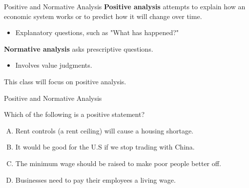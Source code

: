 \documentclass{beamer}
\begin{document}
\begin{frame}{Positive and Normative Analysis}
  \textbf{Positive analysis} attempts to explain how an economic system works or to predict how it will change over time.

  \begin{itemize}
    \item Explanatory questions, such as "What has happened?"
  \end{itemize}

  \bigskip
  \textbf{Normative analysis} asks prescriptive questions.

  \begin{itemize}
    \item Involves value judgments.
  \end{itemize}

  \bigskip
  \begin{center}
  This class will focus on positive analysis.
  \end{center}
\end{frame}

\begin{frame}{Positive and Normative Analysis}
  \bigskip

  Which of the following is a positive statement?

  \bigskip
  \begin{enumerate}[A)]
    \item Rent controls (a rent ceiling) will cause a housing shortage.
    \item It would be good for the U.S if we stop trading with China.
    \item The minimum wage should be raised to make poor people better off.
    \item Businesses need to pay their employees a living wage.
  \end{enumerate}
\end{frame}

\end{document}
